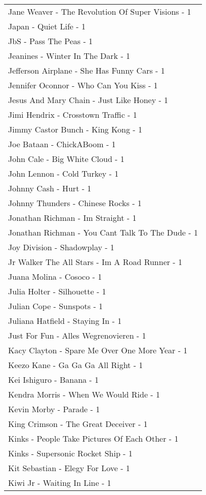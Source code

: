 \documentclass[
]{article}
\begin{document}
\begin{longtable}{l}
Jane Weaver - The Revolution Of Super Visions - 1 \\ 
Japan - Quiet Life - 1 \\ 
JbS - Pass The Peas - 1 \\ 
Jeanines - Winter In The Dark - 1 \\ 
Jefferson Airplane - She Has Funny Cars - 1 \\ 
Jennifer Oconnor - Who Can You Kiss - 1 \\ 
Jesus And Mary Chain - Just Like Honey - 1 \\ 
Jimi Hendrix - Crosstown Traffic - 1 \\ 
Jimmy Castor Bunch - King Kong - 1 \\ 
Joe Bataan - ChickABoom - 1 \\ 
John Cale - Big White Cloud - 1 \\ 
John Lennon - Cold Turkey - 1 \\ 
Johnny Cash - Hurt - 1 \\ 
Johnny Thunders - Chinese Rocks - 1 \\ 
Jonathan Richman - Im Straight - 1 \\ 
Jonathan Richman - You Cant Talk To The Dude - 1 \\ 
Joy Division - Shadowplay - 1 \\ 
Jr Walker The All Stars - Im A Road Runner - 1 \\ 
Juana Molina - Cosoco - 1 \\ 
Julia Holter - Silhouette - 1 \\ 
Julian Cope - Sunspots - 1 \\ 
Juliana Hatfield - Staying In - 1 \\ 
Just For Fun - Alles Wegrenovieren - 1 \\ 
Kacy Clayton - Spare Me Over One More Year - 1 \\ 
Keezo Kane - Ga Ga Ga All Right - 1 \\ 
Kei Ishiguro - Banana - 1 \\ 
Kendra Morris - When We Would Ride - 1 \\ 
Kevin Morby - Parade - 1 \\ 
King Crimson - The Great Deceiver - 1 \\ 
Kinks - People Take Pictures Of Each Other - 1 \\ 
Kinks - Supersonic Rocket Ship - 1 \\ 
Kit Sebastian - Elegy For Love - 1 \\ 
Kiwi Jr - Waiting In Line - 1 \\ 

\end{longtable}
\end{document}
